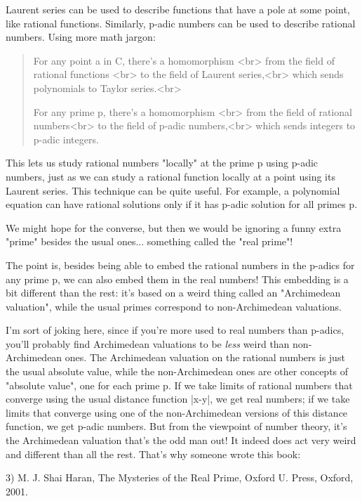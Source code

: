 Laurent series can be used to describe functions that have a pole at some
point, like rational functions.  Similarly, p-adic numbers can be used 
to describe rational numbers.  Using more math jargon:

\begin{quote}
   For any point a in C, there's a homomorphism  <br>
   from the field of rational functions <br>
   to the field of Laurent series,<br>
   which sends polynomials to Taylor series.<br>

   For any prime p, there's a homomorphism <br>
   from the field of rational numbers<br>
   to the field of p-adic numbers,<br>
   which sends integers to p-adic integers.
\end{quote}

This lets us study rational numbers "locally" at the prime p
using p-adic numbers, just as we can study a rational function locally
at a point using its Laurent series.  This technique can be quite
useful.  For example, a polynomial equation can have rational
solutions only if it has p-adic solution for all primes p.

We might hope for the converse, but then we would be ignoring a funny
extra "prime" besides the usual ones... something called the
"real prime"!

The point is, besides being able to embed the rational numbers in the
p-adics for any prime p, we can also embed them in the real numbers!
This embedding is a bit different than the rest: it's based on a weird
thing called an "Archimedean valuation", while the usual
primes correspond to non-Archimedean valuations.

I'm sort of joking here, since if you're more used to real numbers
than p-adics, you'll probably find Archimedean valuations to be \emph{less}
weird than non-Archimedean ones.  The Archimedean valuation on the
rational numbers is just the usual absolute value, while the
non-Archimedean ones are other concepts of "absolute value",
one for each prime p.  If we take limits of rational numbers that
converge using the usual distance function |x-y|, we get real numbers;
if we take limits that converge using one of the non-Archimedean
versions of this distance function, we get p-adic numbers.  But from
the viewpoint of number theory, it's the Archimedean valuation that's
the odd man out!  It indeed does act very weird and different than all
the rest.  That's why someone wrote this book:

3) M. J. Shai Haran, The Mysteries of the Real Prime, Oxford
U. Press, Oxford, 2001. 

